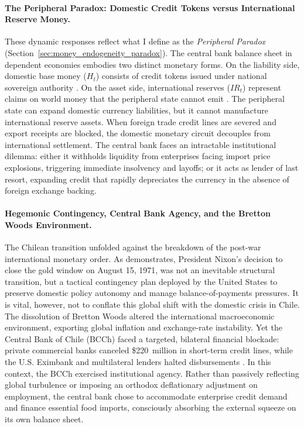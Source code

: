 \paragraph{The Peripheral Paradox: Domestic Credit Tokens versus International Reserve Money.}
These dynamic responses reflect what I define as the \emph{Peripheral Paradox} (Section~\ref{sec:money_endogeneity_paradox}). The central bank balance sheet in dependent economies embodies two distinct monetary forms. On the liability side, domestic base money ($H_t$) consists of credit tokens issued under national sovereign authority \citep{Basu2022}. On the asset side, international reserves ($IR_t$) represent claims on world money that the peripheral state cannot emit \citep{Vasudevan2009,AlamiEtAl2022}. The peripheral state can expand domestic currency liabilities, but it cannot manufacture international reserve assets. When foreign trade credit lines are severed and export receipts are blocked, the domestic monetary circuit decouples from international settlement. The central bank faces an intractable institutional dilemma: either it withholds liquidity from enterprises facing import price explosions, triggering immediate insolvency and layoffs; or it acts as lender of last resort, expanding credit that rapidly depreciates the currency in the absence of foreign exchange backing.

\paragraph{Hegemonic Contingency, Central Bank Agency, and the Bretton Woods Environment.}
The Chilean transition unfolded against the breakdown of the post-war international monetary order. As \citet{Zoeller2019} demonstrates, President Nixon's decision to close the gold window on August 15, 1971, was not an inevitable structural transition, but a tactical contingency plan deployed by the United States to preserve domestic policy autonomy and manage balance-of-payments pressures. It is vital, however, not to conflate this global shift with the domestic crisis in Chile. The dissolution of Bretton Woods altered the international macroeconomic environment, exporting global inflation and exchange-rate instability. Yet the Central Bank of Chile (BCCh) faced a targeted, bilateral financial blockade: private commercial banks canceled \$220~million in short-term credit lines, while the U.S. Eximbank and multilateral lenders halted disbursements \citep{DeVylder1976,PetrasMorley1975}. In this context, the BCCh exercised institutional agency. Rather than passively reflecting global turbulence or imposing an orthodox deflationary adjustment on employment, the central bank chose to accommodate enterprise credit demand and finance essential food imports, consciously absorbing the external squeeze on its own balance sheet.

